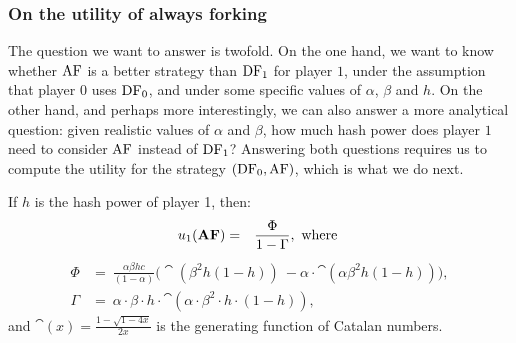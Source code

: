 \subsubsection{On the utility of always forking}
The question we want to answer is twofold. On the one hand, we want to know whether $\text{\rm AF}$ is a better strategy than $\text{\rm DF}_1$ for player $1$, under the assumption that player $0$ uses $\text{\rm DF}_0$, and under some specific values of $\alpha$, $\beta$ and $h$. 
On the other hand, and 
perhaps more interestingly, we can also answer a more analytical question: given realistic values of $\alpha$ and $\beta$, how much hash power does player $1$ need to consider $\text{\rm AF}$ instead of $\text{\rm DF}_1$? 
Answering both questions requires us to compute the utility for the  strategy $(\text{\rm DF}_0,\text{\rm AF})$, which is what we do next. 

\begin{theorem}\label{thm:always_fork}
If $h$ is the hash power of player 1, then:
\begin{eqnarray*}
u_1(\text{\rm {\bf AF}}) &=& \frac{\Phi}{1-\Gamma}, \mbox{ where }
\end{eqnarray*}
{\small\begin{align*}
\Phi & = \ \frac{\alpha  \beta  h  c}{(1-\alpha)}  \big(\cat(\beta^2  h  (1-h)) \ -
 \alpha\cdot \cat(\alpha \beta^2  h  (1-h))\big),\\
\Gamma & = \ \alpha \cdot \beta \cdot h \cdot \cat(\alpha\cdot \beta^2 \cdot h \cdot (1-h)),
\end{align*}}
and $\cat(x) = \frac{1-\sqrt{1-4x}}{2x}$ is the generating function of Catalan numbers.
\end{theorem}



